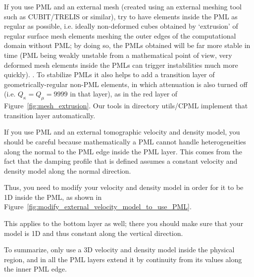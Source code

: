 If you use PML and an external mesh (created using an external meshing tool
such as CUBIT/TRELIS or similar), try to have elements inside the PML as regular as possible,
i.e. ideally non-deformed cubes obtained by `extrusion' of regular surface mesh elements meshing the
outer edges of the computational domain without PML; by doing so, the PMLs obtained will be far more stable
in time (PML being weakly unstable from a mathematical point of view, very deformed mesh elements
inside the PMLs can trigger instabilities much more quickly). . To stabilize PMLs it also helps to add a transition layer of geometrically-regular non-PML elements, in which attenuation is also
turned off (i.e. $Q_\kappa = Q_\mu = 9999$ in that layer), as in the red layer of Figure~\ref{fig:mesh_extrusion}.
Our tools in directory utils/CPML implement that transition layer automatically.

If you use PML and an external tomographic velocity and density model,
you should be careful because mathematically a PML cannot handle heterogeneities
along the normal to the PML edge inside the PML layer. This comes
from the fact that the damping profile that is defined assumes a constant
velocity and density model along the normal direction.

Thus, you need to modify your velocity and density model in order
for it to be 1D inside the PML, as shown in Figure~\ref{fig:modify_external_velocity_model_to_use_PML}.

This applies to the bottom layer as well; there you should make sure
that your model is 1D and thus constant along the vertical direction.

To summarize, only use a 3D velocity and density model inside the
physical region, and in all the PML layers extend it by continuity
from its values along the inner PML edge.

